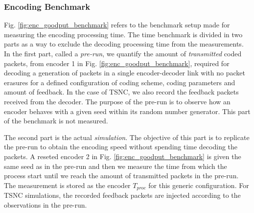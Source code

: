 \subsubsection{Encoding Benchmark}
Fig. \ref{fig:enc_goodput_benchmark} refers to the benchmark setup
made for measuring the encoding processing time.
The time benchmark
is divided in two parts as a way to exclude the decoding processing
time from the measurements. In the first part, called a \textit{pre-run},
we quantify the amount of \textit{transmitted} coded packets, from
encoder 1 in Fig. \ref{fig:enc_goodput_benchmark}, required for
decoding a generation of packets in a single encoder-decoder link
with no packet erasures
for a defined configuration of coding scheme, coding parameters and
amount of feedback. In the case of \ac{TSNC}, we also record the
feedback packets received from the decoder. The purpose of
the pre-run is to observe how an encoder behaves with a given
seed within its random number generator.
This part of the benchmark is not measured.

The second part is the actual \textit{simulation}. The objective of this
part is to replicate the pre-run to obtain the encoding speed without
spending time decoding the packets.
A reseted encoder 2 in Fig. \ref{fig:enc_goodput_benchmark} is given the
same seed as in the pre-run and then we measure the time from which the
process start until we reach the amount of transmitted packets in the
pre-run. The measurement is stored as the encoder $T_{proc}$ for
this generic configuration. For \ac{TSNC} simulations, the recorded
feedback packets are injected according to the observations in the pre-run.

